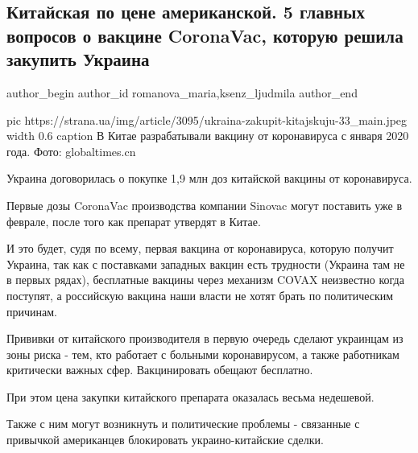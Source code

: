  
 
 
 
 
 
\subsection{Китайская по цене американской. 5 главных вопросов о вакцине CoronaVac, которую решила закупить Украина}
\label{sec:30_12_2020.news.ua.strana.romanova_maria.1.kitai_vaccine}
\ifcmt
	author_begin
   author_id romanova_maria,ksenz_ljudmila
	author_end
\fi

\ifcmt
  pic https://strana.ua/img/article/3095/ukraina-zakupit-kitajskuju-33_main.jpeg
  width 0.6
	caption В Китае разрабатывали вакцину от коронавируса с января 2020 года. Фото: globaltimes.cn
\fi

Украина договорилась о покупке 1,9 млн доз китайской вакцины от коронавируса.

Первые дозы CoronaVac производства компании Sinovac могут поставить уже в
феврале, после того как препарат утвердят в Китае. 

И это будет, судя по всему, первая вакцина от коронавируса, которую получит
Украина, так как с поставками западных вакцин есть трудности (Украина там не в
первых рядах), бесплатные вакцины через механизм COVAX неизвестно когда
поступят, а российскую вакцина наши власти не хотят брать по политическим
причинам.

Прививки от китайского производителя в первую очередь сделают украинцам из зоны
риска - тем, кто работает с больными коронавирусом, а также работникам
критически важных сфер. Вакцинировать обещают бесплатно.

При этом цена закупки китайского препарата оказалась весьма недешевой.

Также с ним могут возникнуть и политические проблемы - связанные с привычкой
американцев блокировать украино-китайские сделки. 

